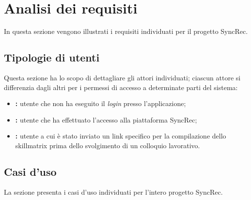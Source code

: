 
\chapter{Analisi dei requisiti}
\label{cap:descrizione-stage}
In questa sezione vengono illustrati i requisiti individuati per il progetto SyncRec.

\section{Tipologie di utenti}
Questa sezione ha lo scopo di dettagliare gli attori individuati; ciascun attore si differenzia dagli altri per i permessi di accesso a determinate parti del sistema:
\begin{itemize}	
	\item \textbf{\nonlogged:} utente che non ha eseguito il \textit{login} presso l'applicazione;
	\item \textbf{\loggedusr:} utente che ha effettuato l'accesso alla piattaforma SyncRec;
	\item \textbf{\applicant:} utente a cui è stato inviato un link specifico per la compilazione dello skillmatrix prima dello svolgimento di un colloquio lavorativo. 
\end{itemize}

\section{Casi d'uso}
La sezione presenta i casi d'uso individuati per l'intero progetto SyncRec.



